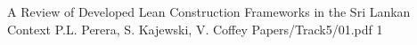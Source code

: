 



   \addpaper
    	{A Review of Developed Lean Construction Frameworks in the Sri Lankan Context}
   		 {P.L. Perera, S. Kajewski, V. Coffey} 
   		 {Papers/Track5/01.pdf}
        {1} 









